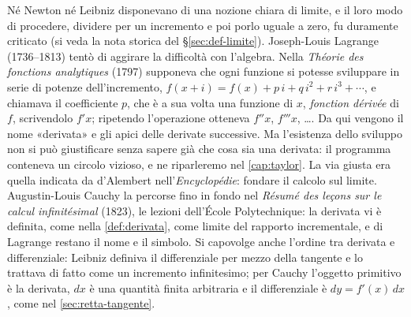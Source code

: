 \begin{notastorica}
Né Newton né Leibniz disponevano di una nozione chiara di limite, e il loro modo di
procedere, dividere per un incremento e poi porlo uguale a zero, fu duramente criticato
(si veda la nota storica del \S\ref{sec:def-limite}). Joseph-Louis Lagrange (1736--1813)
tentò di aggirare la difficoltà con l'algebra. Nella \emph{Théorie des fonctions
analytiques} (1797) supponeva che ogni funzione si potesse sviluppare in serie di potenze
dell'incremento, $f(x+i)=f(x)+p\,i+q\,i^{2}+r\,i^{3}+\cdots$, e chiamava il coefficiente
$p$, che è a sua volta una funzione di $x$, \emph{fonction dérivée} di $f$, scrivendolo
$f'x$; ripetendo l'operazione otteneva $f''x$, $f'''x$, \ldots. Da qui vengono il nome
«derivata» e gli apici delle derivate successive. Ma l'esistenza dello sviluppo non si
può giustificare senza sapere già che cosa sia una derivata: il programma conteneva un
circolo vizioso, e ne riparleremo nel \cref{cap:taylor}. La via giusta era quella
indicata da d'Alembert nell'\emph{Encyclopédie}: fondare il calcolo sul limite.
Augustin-Louis Cauchy la percorse fino in fondo nel \emph{Résumé des leçons sur le calcul
infinitésimal} (1823), le lezioni dell'École Polytechnique: la derivata vi è definita, come
nella \cref{def:derivata}, come limite del rapporto incrementale, e di Lagrange restano il
nome e il simbolo. Si capovolge anche l'ordine tra derivata e differenziale: Leibniz
definiva il differenziale per mezzo della tangente e lo trattava di fatto come un
incremento infinitesimo; per Cauchy l'oggetto primitivo è la derivata, $dx$ è una
quantità finita arbitraria e il differenziale è $dy=f'(x)\,dx$, come nel
\cref{sec:retta-tangente}.
\end{notastorica}
